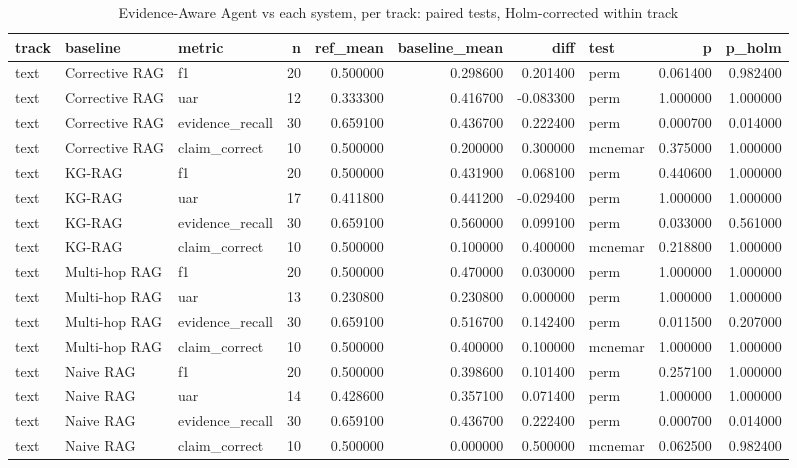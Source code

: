 \begin{table}
\caption{Evidence-Aware Agent vs each system, per track: paired tests, Holm-corrected within track}
\label{tab:table_significance}
\begin{tabular}{lllrrrrlrr}
\toprule
track & baseline & metric & n & ref\_mean & baseline\_mean & diff & test & p & p\_holm \\
\midrule
text & Corrective RAG & f1 & 20 & 0.500000 & 0.298600 & 0.201400 & perm & 0.061400 & 0.982400 \\
text & Corrective RAG & uar & 12 & 0.333300 & 0.416700 & -0.083300 & perm & 1.000000 & 1.000000 \\
text & Corrective RAG & evidence\_recall & 30 & 0.659100 & 0.436700 & 0.222400 & perm & 0.000700 & 0.014000 \\
text & Corrective RAG & claim\_correct & 10 & 0.500000 & 0.200000 & 0.300000 & mcnemar & 0.375000 & 1.000000 \\
text & KG-RAG & f1 & 20 & 0.500000 & 0.431900 & 0.068100 & perm & 0.440600 & 1.000000 \\
text & KG-RAG & uar & 17 & 0.411800 & 0.441200 & -0.029400 & perm & 1.000000 & 1.000000 \\
text & KG-RAG & evidence\_recall & 30 & 0.659100 & 0.560000 & 0.099100 & perm & 0.033000 & 0.561000 \\
text & KG-RAG & claim\_correct & 10 & 0.500000 & 0.100000 & 0.400000 & mcnemar & 0.218800 & 1.000000 \\
text & Multi-hop RAG & f1 & 20 & 0.500000 & 0.470000 & 0.030000 & perm & 1.000000 & 1.000000 \\
text & Multi-hop RAG & uar & 13 & 0.230800 & 0.230800 & 0.000000 & perm & 1.000000 & 1.000000 \\
text & Multi-hop RAG & evidence\_recall & 30 & 0.659100 & 0.516700 & 0.142400 & perm & 0.011500 & 0.207000 \\
text & Multi-hop RAG & claim\_correct & 10 & 0.500000 & 0.400000 & 0.100000 & mcnemar & 1.000000 & 1.000000 \\
text & Naive RAG & f1 & 20 & 0.500000 & 0.398600 & 0.101400 & perm & 0.257100 & 1.000000 \\
text & Naive RAG & uar & 14 & 0.428600 & 0.357100 & 0.071400 & perm & 1.000000 & 1.000000 \\
text & Naive RAG & evidence\_recall & 30 & 0.659100 & 0.436700 & 0.222400 & perm & 0.000700 & 0.014000 \\
text & Naive RAG & claim\_correct & 10 & 0.500000 & 0.000000 & 0.500000 & mcnemar & 0.062500 & 0.982400 \\

\end{tabular}
\end{table}
